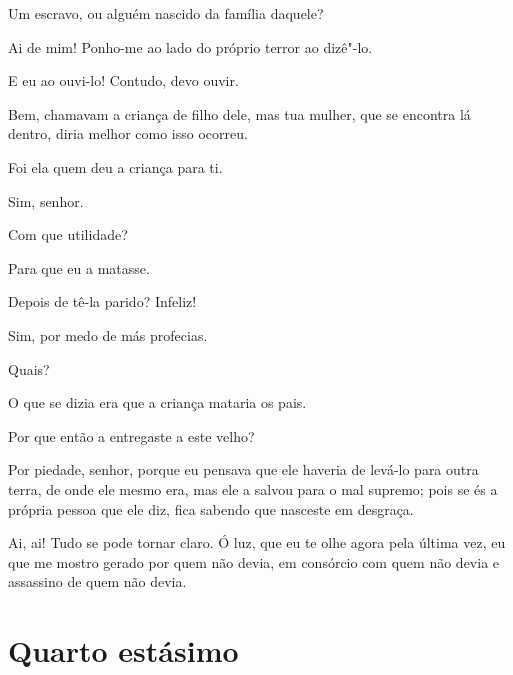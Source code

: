    Um escravo, ou alguém nascido da família daquele?

   Ai de mim! Ponho-me ao lado do próprio terror ao dizê"-lo.

   E eu ao ouvi-lo! Contudo, devo ouvir.

   Bem, chamavam a criança de filho dele, mas tua mulher, que se encontra
lá dentro, diria melhor como isso ocorreu.

   Foi ela quem deu a criança para ti.

   Sim, senhor.

   Com que utilidade?

   Para que eu a matasse.

   Depois de tê-la parido? Infeliz!

   Sim, por medo de más profecias.

   Quais?

   O que se dizia era que a criança mataria os pais.

   Por que então a entregaste a este velho?

   Por piedade, senhor, porque eu pensava que ele haveria de levá-lo para
outra terra, de onde ele mesmo era, mas ele a salvou para o mal
supremo; pois se és a própria pessoa que ele diz, fica sabendo que
nasceste em desgraça.

   Ai, ai! Tudo se pode tornar claro. Ó luz, que eu te olhe agora pela
última vez, eu que me mostro gerado por quem não devia, em consórcio com
quem não devia e assassino de quem não devia.


\section{Quarto estásimo}




